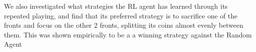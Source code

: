 \documentclass[11pt, oneside]{article}   	%
\begin{document}
\hfill

We also investigated what strategies the RL agent has learned through its repeated playing, and find that its preferred strategy is to sacrifice one of the fronts and focus on the other 2 fronts, splitting its coins almost evenly between them. This was shown empirically to be a a winning strategy against the Random Agent

\nocite{*}


\end{document}
